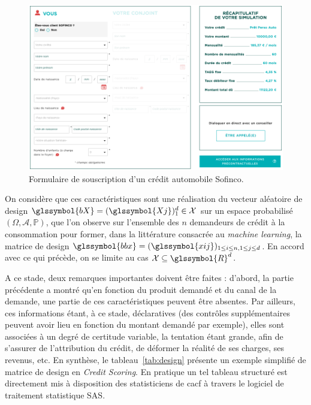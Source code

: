 \begin{figure}
\centering \includegraphics[width=15cm]{figures/chapitre1/souscription.png}
\caption{\label{fig:souscription} Formulaire de souscription d'un crédit automobile Sofinco.}
\end{figure}

On considère que ces caractéristiques sont une réalisation du vecteur aléatoire de design $\glssymbol{bX} = (\glssymbol{Xj})_1^d \in \mathcal{X}$ sur un espace probabilisé $(\Omega,\mathcal{A},\mathbb{P})$, que l'on observe sur l'ensemble des $n$ demandeurs de crédit à la consommation pour former, dans la littérature consacrée au \textit{machine learning}, la matrice de design $\glssymbol{bbx} = (\glssymbol{xij})_{1 \leq i \leq n, 1 \leq j \leq d}$. En accord avec ce qui précède, on se limite au cas $\mathcal{X} \subseteq\glssymbol{R}^d$.

A ce stade, deux remarques importantes doivent être faites : d'abord, la partie précédente a montré qu'en fonction du produit demandé et du canal de la demande, une partie de ces caractéristiques peuvent être absentes. Par ailleurs, ces informations étant, à ce stade, déclaratives (des contrôles supplémentaires peuvent avoir lieu en fonction du montant demandé par exemple), elles sont associées à un degré de certitude variable, la tentation étant grande, afin de s'assurer de l'attribution du crédit, de déformer la réalité de ses charges, ses revenus, etc. En synthèse, le tableau~\ref{tab:design} présente un exemple simplifié de matrice de design en \textit{Credit Scoring}. En pratique un tel tableau structuré est directement mis à disposition des statisticiens de \gls{cacf} à travers le logiciel de traitement statistique SAS.


